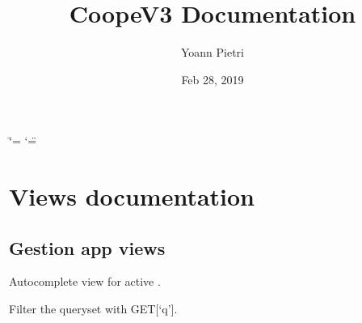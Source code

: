 \documentclass[letterpaper,10pt,english]{sphinxmanual}
\title{CoopeV3 Documentation}
\date{Feb 28, 2019}
\author{Yoann Pietri}
\begin{document}
\ifdefined\shorthandoff
  \ifnum\catcode`\=\string=\active\shorthandoff{=}\fi
  \ifnum\catcode`\"=\active{}\fi
\fi

\pagestyle{empty}
\sphinxmaketitle
\pagestyle{plain}
\sphinxtableofcontents
\pagestyle{normal}
\label{\detokenize{index::doc}}



\chapter{Views documentation}
\label{\detokenize{modules/views:views-documentation}}\label{\detokenize{modules/views::doc}}

\section{Gestion app views}
\label{\detokenize{modules/views:module-gestion.views}}\label{\detokenize{modules/views:gestion-app-views}}

\begin{fulllineitems}
\label{\detokenize{modules/views:gestion.views.ActiveProductsAutocomplete}}
Autocomplete view for active {\hyperref[\detokenize{modules/models:gestion.models.Product}]{}}.

\begin{fulllineitems}
\label{\detokenize{modules/views:gestion.views.ActiveProductsAutocomplete.get_queryset}}
Filter the queryset with GET{[}‘q’{]}.

\end{fulllineitems}


\end{fulllineitems}

\end{document}
